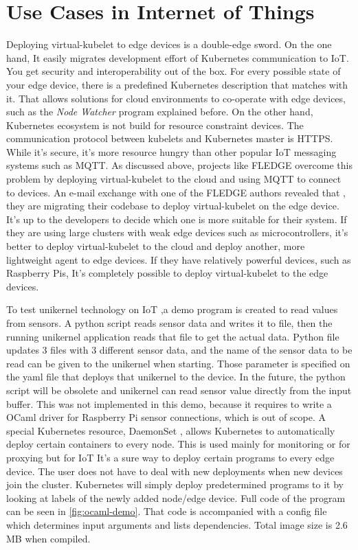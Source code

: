 \section{Use Cases in Internet of Things}

Deploying virtual-kubelet to edge devices is a double-edge sword. On the one hand, It easily migrates development effort of Kubernetes communication to IoT. You get security and interoperability out of the box. For every possible state of your edge device, there is a predefined Kubernetes description that matches with it. That allows solutions for cloud environments to co-operate with edge devices, such as the \textit{Node Watcher} program explained before. On the other hand, Kubernetes ecosystem is not build for resource constraint devices. The communication protocol between kubelets and Kubernetes master is HTTPS. While it's secure, it's more resource hungry than other popular IoT messaging systems such as MQTT. As discussed above, projects like FLEDGE overcome this problem by deploying virtual-kubelet to the cloud and using MQTT to connect to devices. An e-mail exchange with one of the FLEDGE authors revealed that , they are migrating their codebase to deploy virtual-kubelet on the edge device. It's up to the developers to decide which one is more suitable for their system. If they are using large clusters with weak edge devices such as microcontrollers, it's better to deploy virtual-kubelet to the cloud and deploy another, more lightweight agent to edge devices. If they have relatively powerful devices, such as Raspberry Pis, It's completely possible to deploy virtual-kubelet to the edge devices.

To test unikernel technology on IoT ,a demo program is created to read values from sensors. A python script reads sensor data and writes it to file, then the running unikernel application reads that file to get the actual data. Python file updates 3 files with 3 different sensor data, and the name of the sensor data to be read can be given to the unikernel when starting. Those parameter is specified on the yaml file that deploys that unikernel to the device. In the future, the python script will be obsolete and unikernel can read sensor value directly from the input buffer. This was not implemented in this demo, because it requires to write a OCaml driver for Raspberry Pi sensor connections, which is out of scope. A special Kubernetes resource, DaemonSet , allows Kubernetes to automatically deploy certain containers to every node. This is used mainly for monitoring or for proxying but for IoT It's a sure way to deploy certain programs to every edge device. The user does not have to deal with new deployments when new devices join the cluster. Kubernetes will simply deploy predetermined programs to it by looking at labels of the newly added node/edge device. Full code of the program can be seen in \ref{fig:ocaml-demo}. That code is accompanied with a config file which determines input arguments and lists dependencies. Total image size is 2.6 MB when compiled.

